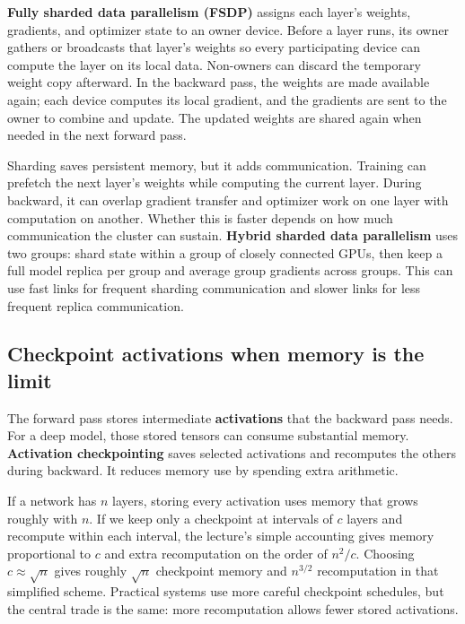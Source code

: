 \textbf{Fully sharded data parallelism (FSDP)} assigns each layer's weights, gradients, and optimizer state to an owner device. Before a layer runs, its owner gathers or broadcasts that layer's weights so every participating device can compute the layer on its local data. Non-owners can discard the temporary weight copy afterward. In the backward pass, the weights are made available again; each device computes its local gradient, and the gradients are sent to the owner to combine and update. The updated weights are shared again when needed in the next forward pass.

Sharding saves persistent memory, but it adds communication. Training can prefetch the next layer's weights while computing the current layer. During backward, it can overlap gradient transfer and optimizer work on one layer with computation on another. Whether this is faster depends on how much communication the cluster can sustain. \textbf{Hybrid sharded data parallelism} uses two groups: shard state within a group of closely connected GPUs, then keep a full model replica per group and average group gradients across groups. This can use fast links for frequent sharding communication and slower links for less frequent replica communication.

\subsection{Checkpoint activations when memory is the limit}\label{04-visual-computing-ii-ch031-checkpoint-activations-when-memory-is-the-limit}

The forward pass stores intermediate \textbf{activations} that the backward pass needs. For a deep model, those stored tensors can consume substantial memory. \textbf{Activation checkpointing} saves selected activations and recomputes the others during backward. It reduces memory use by spending extra arithmetic.

If a network has \(n\) layers, storing every activation uses memory that grows roughly with \(n\). If we keep only a checkpoint at intervals of \(c\) layers and recompute within each interval, the lecture's simple accounting gives memory proportional to \(c\) and extra recomputation on the order of \(n^2/c\). Choosing \(c\approx\sqrt n\) gives roughly \(\sqrt n\) checkpoint memory and \(n^{3/2}\) recomputation in that simplified scheme. Practical systems use more careful checkpoint schedules, but the central trade is the same: more recomputation allows fewer stored activations.

